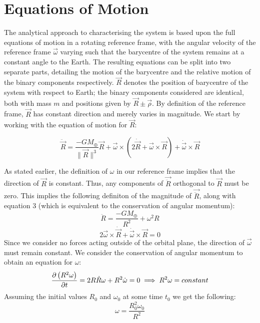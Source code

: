 \documentclass[letterpaper, preprint, paper,11pt]{AAS}	%
\begin{document}
\section{Equations of Motion}

The analytical approach to characterising the system is based upon the full equations of motion in a rotating reference frame, with the angular velocity of the reference frame $\vec{\omega}$ varying such that the barycentre of the system remains at a constant angle to the Earth. The resulting equations can be split into two separate parts, detailing the motion of the barycentre and the relative motion of the binary components respectively. $\vec{R}$ denotes the position of barycentre of the system with respect to Earth; the binary components considered are identical, both with mass $m$ and positions given by $\vec{R}\pm\vec{\rho}$. By definition of the reference frame, $\vec{R}$ has constant direction and merely varies in magnitude. We start by working with the equation of motion for $\vec{R}$:

\begin{equation}
\ddot{\vec{R}} = \frac{-GM_\oplus}{\|\vec{R}\|^{3}}\vec{R}+\vec{\omega}\times(2\dot{\vec{R}}+\vec{\omega}\times\vec{R})+\dot{\vec{\omega}}\times\vec{R}
\end{equation}

As stated earlier, the definition of $\omega$ in our reference frame implies that the direction of $\vec{R}$ is constant. Thus, any components of $\vec{\ddot{R}}$ orthogonal to $\vec{R}$ must be zero. This implies the following definiton of the magnitude of $\vec{\ddot{R}}$, along with equation 3 (which is equivalent to the conservation of angular momentum): 
\begin{equation}
\ddot{R} = \frac{-GM_\oplus}{R^{2}}+\omega^{2}R
\end{equation}
\begin{equation}
2\vec{\omega}\times\dot{\vec{R}}+\dot{\vec{\omega}}\times\vec{R}=0
\end{equation}
Since we consider no forces acting outside of the orbital plane, the direction of $\vec{\omega}$ must remain constant. We consider the conservation of angular momentum to obtain an equation for $\omega$:
\begin{equation}
\notag\frac{\partial\left(R^{2}\omega\right)}{\partial t} = 2R\dot{R}\omega + R^{2}\dot{\omega} = 0 \implies R^{2}\omega = constant
\end{equation}
Assuming the initial values $R_0$ and $\omega_0$ at some time $t_0$ we get the following:
\begin{equation}
\omega = \frac{R_0^{2}\omega_0}{R^{2}}
\end{equation}
\end{document}
